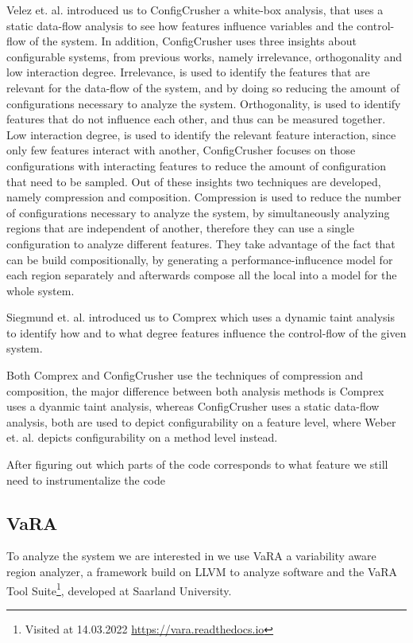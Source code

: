 Velez et. al. introduced us to ConfigCrusher \cite{ConfigCrusher} a white-box analysis, that uses a static data-flow analysis to see how features influence 
variables and the control-flow of the system. In addition, ConfigCrusher uses three insights about configurable systems, from previous works, namely
irrelevance, orthogonality and low interaction degree. Irrelevance, is used to identify the features that are relevant for the data-flow of the system, and by
doing so reducing the amount of configurations necessary to analyze the system. Orthogonality, is used to identify features that do not influence each other, and
thus can be measured together. Low interaction degree, is used to identify the relevant feature interaction, since only few features interact with another, 
ConfigCrusher focuses on those configurations with interacting features to reduce the amount of configuration that need to be sampled. 
Out of these insights two techniques are developed, namely compression and composition.
Compression is used to reduce the number of configurations necessary to analyze the system,
by simultaneously analyzing regions that are independent of another, therefore they can use a single configuration to 
analyze different features. 
They take advantage of the fact that \perfInfluenceModel can be build compositionally, by generating a performance-influcence model for each region separately
and afterwards compose all the local \perfInfluenceModel into a model for the whole system.

Siegmund et. al. introduced us to Comprex \cite{Comprex} which uses a dynamic taint analysis to identify how
and to what degree features influence the control-flow of the given system. 

Both Comprex and ConfigCrusher use the techniques of compression and composition, the major difference between both analysis methods is Comprex uses a dyanmic taint
analysis, whereas ConfigCrusher uses a static data-flow analysis, both are used to depict configurability on a feature level, where Weber et. al. depicts
configurability on a method level instead. 

After figuring out which parts of the code corresponds to what feature we still need to instrumentalize the code 

\subsection{VaRA}\label{VaRA}
To analyze the system we are interested in we use VaRA a variability aware region analyzer, a framework build on LLVM to analyze software
and the VaRA Tool Suite\footnote{Visited at 14.03.2022 \url{https://vara.readthedocs.io}}, developed at Saarland University. 

